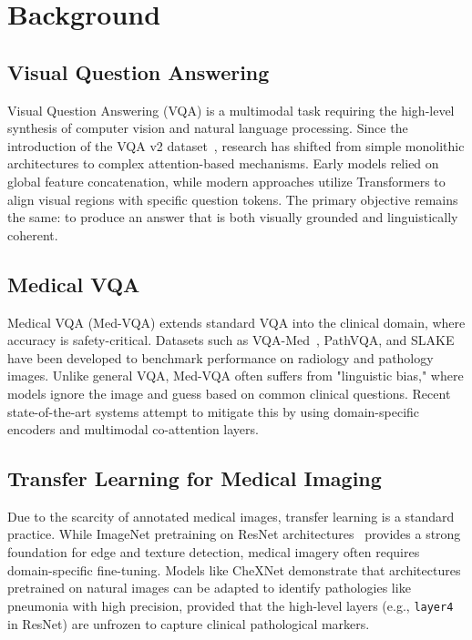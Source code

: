 \documentclass{article}
\begin{document}
\section{Background}

\subsection{Visual Question Answering}
Visual Question Answering (VQA) is a multimodal task requiring the high-level synthesis of computer vision and natural language processing. Since the introduction of the VQA v2 dataset~\cite{goyal2017making}, research has shifted from simple monolithic architectures to complex attention-based mechanisms. Early models relied on global feature concatenation, while modern approaches utilize Transformers to align visual regions with specific question tokens. The primary objective remains the same: to produce an answer that is both visually grounded and linguistically coherent.

\subsection{Medical VQA}
Medical VQA (Med-VQA) extends standard VQA into the clinical domain, where accuracy is safety-critical. Datasets such as VQA-Med~\cite{lau2018dataset}, PathVQA, and SLAKE~\cite{liu2021slake} have been developed to benchmark performance on radiology and pathology images. Unlike general VQA, Med-VQA often suffers from "linguistic bias," where models ignore the image and guess based on common clinical questions. Recent state-of-the-art systems attempt to mitigate this by using domain-specific encoders and multimodal co-attention layers.

\subsection{Transfer Learning for Medical Imaging}
Due to the scarcity of annotated medical images, transfer learning is a standard practice. While ImageNet pretraining on ResNet architectures~\cite{he2016resnet} provides a strong foundation for edge and texture detection, medical imagery often requires domain-specific fine-tuning. Models like CheXNet demonstrate that architectures pretrained on natural images can be adapted to identify pathologies like pneumonia with high precision, provided that the high-level layers (e.g., \texttt{layer4} in ResNet) are unfrozen to capture clinical pathological markers.
\end{document}
